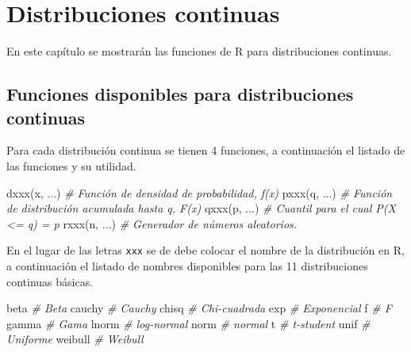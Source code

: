 \documentclass[
]{book}
\makeatletter
\newenvironment{Shaded}{\begin{snugshade}}{\end{snugshade}}
\newcommand{\CommentTok}[1]{\textcolor[rgb]{0.56,0.35,0.01}{\textit{#1}}}
\newcommand{\FunctionTok}[1]{\textcolor[rgb]{0.00,0.00,0.00}{#1}}
\newcommand{\NormalTok}[1]{#1}
\newenvironment{kframe}{%
\medskip{}
\setlength{\fboxsep}{.8em}
 \def\at@end@of@kframe{}%
 \ifinner\ifhmode%
  \def\at@end@of@kframe{\end{minipage}}%
  \begin{minipage}{\columnwidth}%
 \fi\fi%
 \def\FrameCommand##1{\hskip\@totalleftmargin \hskip-\fboxsep
 \colorbox{shadecolor}{##1}\hskip-\fboxsep
     \hskip-\linewidth \hskip-\@totalleftmargin \hskip\columnwidth}%
 \MakeFramed {\advance\hsize-\width
   \@totalleftmargin\z@ \linewidth\hsize
   \@setminipage}}%
 {\par\unskip\endMakeFramed%
 \at@end@of@kframe}
\renewenvironment{Shaded}{\begin{kframe}}{\end{kframe}}
\makeatother
\begin{document}
\hypertarget{continuas}{%
\chapter{Distribuciones continuas}\label{continuas}}

En este capítulo se mostrarán las funciones de R para distribuciones continuas.

\hypertarget{funciones-disponibles-para-distribuciones-continuas}{%
\section{Funciones disponibles para distribuciones continuas}\label{funciones-disponibles-para-distribuciones-continuas}}

Para cada distribución continua se tienen 4 funciones, a continuación el listado de las funciones y su utilidad.

\begin{Shaded}
\begin{Highlighting}[]
\FunctionTok{dxxx}\NormalTok{(x, ...)  }\CommentTok{\# Función de densidad de probabilidad, f(x)}
\FunctionTok{pxxx}\NormalTok{(q, ...)  }\CommentTok{\# Función de distribución acumulada hasta q, F(x)}
\FunctionTok{qxxx}\NormalTok{(p, ...)  }\CommentTok{\# Cuantil para el cual P(X \textless{}= q) = p}
\FunctionTok{rxxx}\NormalTok{(n, ...)  }\CommentTok{\# Generador de números aleatorios.}
\end{Highlighting}
\end{Shaded}

En el lugar de las letras \texttt{xxx} se de debe colocar el nombre de la distribución en R, a continuación el listado de nombres disponibles para las 11 distribuciones continuas básicas.

\begin{Shaded}
\begin{Highlighting}[]
\NormalTok{beta     }\CommentTok{\# Beta}
\NormalTok{cauchy   }\CommentTok{\# Cauchy}
\NormalTok{chisq    }\CommentTok{\# Chi{-}cuadrada}
\NormalTok{exp      }\CommentTok{\# Exponencial}
\NormalTok{f        }\CommentTok{\# F}
\NormalTok{gamma    }\CommentTok{\# Gama}
\NormalTok{lnorm    }\CommentTok{\# log{-}normal}
\NormalTok{norm     }\CommentTok{\# normal}
\NormalTok{t        }\CommentTok{\# t{-}student}
\NormalTok{unif     }\CommentTok{\# Uniforme}
\NormalTok{weibull  }\CommentTok{\# Weibull}
\end{Highlighting}
\end{Shaded}
\end{document}
